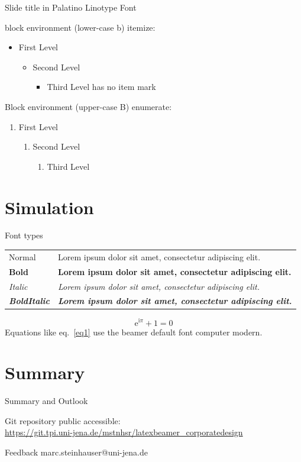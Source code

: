 \documentclass[10pt,aspectratio=43]{beamer}
\begin{document}
	
	
	
	\begin{frame}{Slide title in Palatino Linotype Font}
		\begin{block}{block environment (lower-case b)}
			itemize:
			\begin{itemize}
				\item First Level
				\begin{itemize}
					\item Second Level
					\begin{itemize}
						\item Third Level has no item mark
					\end{itemize}
				\end{itemize}
			\end{itemize}
		\end{block}
		\begin{Block}{Block environment (upper-case B)}
		enumerate:
		\begin{enumerate}
			\item First Level
			\begin{enumerate}
				\item Second Level
				\begin{enumerate}
					\item Third Level
				\end{enumerate}
			\end{enumerate}
		\end{enumerate}
		\end{Block}
	\end{frame}
	
	\section{Simulation}
	\begin{frame}{Font types}
		\begin{table}
			\begin{tabular}{ll}
				Normal & Lorem ipsum dolor sit amet, consectetur adipiscing elit.\\
				\textbf{Bold} & \textbf{Lorem ipsum dolor sit amet, consectetur adipiscing elit.}\\
				\textit{Italic} & \textit{Lorem ipsum dolor sit amet, consectetur adipiscing elit.}\\
				\textbf{\textit{BoldItalic}} & \textbf{\textit{Lorem ipsum dolor sit amet, consectetur adipiscing elit.}}
			\end{tabular}
		\end{table}
		\begin{equation}
			\textrm{e}^{\textrm{i}\pi}+1=0
			\label{eq1}
		\end{equation}
		Equations like eq.~\eqref{eq1} use the beamer default font computer modern.
	\end{frame}
	
	\section{Summary}
	\begin{frame}{Summary and Outlook}
		\begin{Block}{Git repository}
			public accessible:\\
			{\scriptsize\url{https://git.tpi.uni-jena.de/mstnhsr/latexbeamer_corporatedesign}}
		\end{Block}
		\begin{Block}{Feedback}
			marc.steinhauser@uni-jena.de
		\end{Block}
	\end{frame}
	
\end{document}
